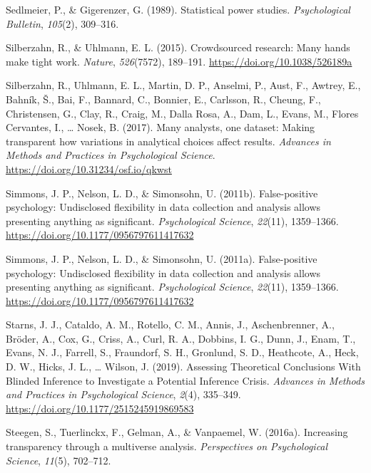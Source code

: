 \documentclass[
  letterpaper,
  DIV=11,
  numbers=noendperiod]{scrreprt}
\newlength{\cslhangindent}
\newlength{\cslentryspacingunit} %
\newenvironment{CSLReferences}[2] %
 {%
  \setlength{\parindent}{0pt}
  \ifodd #1
  \let\oldpar\par
  \def\par{\hangindent=\cslhangindent\oldpar}
  \fi
  \setlength{\parskip}{#2\cslentryspacingunit}
 }%
 {}
\begin{document}
\begin{CSLReferences}{1}{0}
\leavevmode{}%
Sedlmeier, P., \& Gigerenzer, G. (1989). Statistical power studies.
\emph{Psychological Bulletin}, \emph{105}(2), 309--316.

\leavevmode{}%
Silberzahn, R., \& Uhlmann, E. L. (2015). Crowdsourced research: Many
hands make tight work. \emph{Nature}, \emph{526}(7572), 189--191.
\url{https://doi.org/10.1038/526189a}

\leavevmode{}%
Silberzahn, R., Uhlmann, E. L., Martin, D. P., Anselmi, P., Aust, F.,
Awtrey, E., Bahník, Š., Bai, F., Bannard, C., Bonnier, E., Carlsson, R.,
Cheung, F., Christensen, G., Clay, R., Craig, M., Dalla Rosa, A., Dam,
L., Evans, M., Flores Cervantes, I., \ldots{} Nosek, B. (2017). Many
analysts, one dataset: Making transparent how variations in analytical
choices affect results. \emph{Advances in Methods and Practices in
Psychological Science}. \url{https://doi.org/10.31234/osf.io/qkwst}

\leavevmode{}%
Simmons, J. P., Nelson, L. D., \& Simonsohn, U. (2011b). False-positive
psychology: Undisclosed flexibility in data collection and analysis
allows presenting anything as significant. \emph{Psychological Science},
\emph{22}(11), 1359--1366.
\url{https://doi.org/10.1177/0956797611417632}

\leavevmode{}%
Simmons, J. P., Nelson, L. D., \& Simonsohn, U. (2011a). False-positive
psychology: Undisclosed flexibility in data collection and analysis
allows presenting anything as significant. \emph{Psychological Science},
\emph{22}(11), 1359--1366.
\url{https://doi.org/10.1177/0956797611417632}

\leavevmode{}%
Starns, J. J., Cataldo, A. M., Rotello, C. M., Annis, J., Aschenbrenner,
A., Bröder, A., Cox, G., Criss, A., Curl, R. A., Dobbins, I. G., Dunn,
J., Enam, T., Evans, N. J., Farrell, S., Fraundorf, S. H., Gronlund, S.
D., Heathcote, A., Heck, D. W., Hicks, J. L., \ldots{} Wilson, J.
(2019). Assessing Theoretical Conclusions With Blinded Inference to
Investigate a Potential Inference Crisis. \emph{Advances in Methods and
Practices in Psychological Science}, \emph{2}(4), 335--349.
\url{https://doi.org/10.1177/2515245919869583}

\leavevmode{}%
Steegen, S., Tuerlinckx, F., Gelman, A., \& Vanpaemel, W. (2016a).
Increasing transparency through a multiverse analysis.
\emph{Perspectives on Psychological Science}, \emph{11}(5), 702--712.


\end{CSLReferences}
\end{document}
